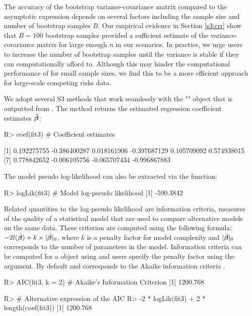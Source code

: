 The accuracy of the bootstrap variance-covariance matrix compared to the asymptotic expression depends on several factors including the sample size and number of bootstrap samples $B$. Our empirical evidence in Section \ref{s3:crr} show that $B = 100$ bootstrap samples provided a sufficient estimate of the variance-covariance matrix for large enough $n$ in our scenarios. In practice, we urge users to increase the number of bootstrap samples until the variance is stable if they can computationally afford to. Although this may hinder the computational performance of  for small sample sizes, we find this to be a more efficient approach for large-scale competing risks data.

We adopt several S3 methods that work seamlessly with the "" object that is outputted from . The  method returns the estimated regression coefficient estimates $\hat{\bm \beta}$:
\begin{example}
R> coef(fit3) # Coefficient estimates

[1] 0.192275755 -0.386400287  0.018161906 -0.397687129  0.105709092  0.574938015  
[7] 0.778842652 -0.006105756 -0.065707434 -0.996867883
\end{example}

The model pseudo log-likelihood can also be extracted via the  function:
\begin{example}
R> logLik(fit3) # Model log-pseudo likelihood
[1] -590.3842
\end{example}

Related quantities to the log-pseudo likelihood are information criteria, measures of the quality of a statistical model that are used to compare alternative models on the same data. These criterion are computed using the following formula: $-2 l(\hat{\bm \beta}) + k \times |\hat{\bm \beta}|_0$, where $k$ is a penalty factor for model complexity and $|\hat{\bm \beta}|_0$ corresponds to the number of parameters in the model. Information criteria can be computed for a  object using  and users specify the penalty factor using the  argument. By default  and corresponds to the Akaike information criteria \citep{akaike1974new}.  
\begin{example}
R> AIC(fit3, k = 2) # Akaike's Information Criterion
[1] 1200.768

R> # Alternative expression of the AIC
R> -2 * logLik(fit3) + 2 * length(coef(fit3))
[1] 1200.768
\end{example}

